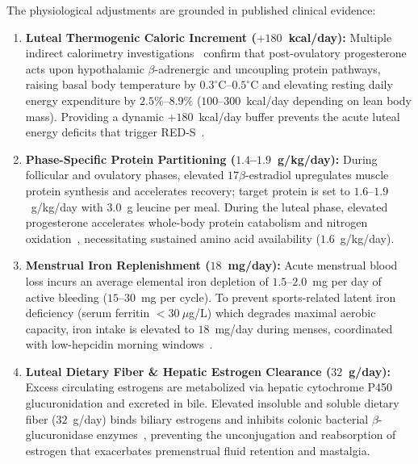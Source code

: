 \documentclass[conference]{IEEEtran}
\begin{document}
The physiological adjustments are grounded in published clinical evidence:
\begin{enumerate}
    \item \textbf{Luteal Thermogenic Caloric Increment ($+180$~kcal/day):} Multiple indirect calorimetry investigations~\cite{barr1995} confirm that post-ovulatory progesterone acts upon hypothalamic $\beta$-adrenergic and uncoupling protein pathways, raising basal body temperature by $0.3^\circ$C--$0.5^\circ$C and elevating resting daily energy expenditure by $2.5\%$--$8.9\%$ ($100$--$300$~kcal/day depending on lean body mass). Providing a dynamic $+180$~kcal/day buffer prevents the acute luteal energy deficits that trigger RED-S~\cite{mountjoy2018}.
    \item \textbf{Phase-Specific Protein Partitioning ($1.4$--$1.9$~g/kg/day):} During follicular and ovulatory phases, elevated $17\beta$-estradiol upregulates muscle protein synthesis and accelerates recovery; target protein is set to $1.6$--$1.9$~g/kg/day with $3.0$~g leucine per meal. During the luteal phase, elevated progesterone accelerates whole-body protein catabolism and nitrogen oxidation~\cite{sims2021, mcnulty2020}, necessitating sustained amino acid availability ($1.6$~g/kg/day).
    \item \textbf{Menstrual Iron Replenishment ($18$~mg/day):} Acute menstrual blood loss incurs an average elemental iron depletion of $1.5$--$2.0$~mg per day of active bleeding ($15$--$30$~mg per cycle). To prevent sports-related latent iron deficiency (serum ferritin $< 30~\mu$g/L) which degrades maximal aerobic capacity, iron intake is elevated to $18$~mg/day during menses, coordinated with low-hepcidin morning windows~\cite{bruinvels2022}.
    \item \textbf{Luteal Dietary Fiber \& Hepatic Estrogen Clearance ($32$~g/day):} Excess circulating estrogens are metabolized via hepatic cytochrome P450 glucuronidation and excreted in bile. Elevated insoluble and soluble dietary fiber ($32$~g/day) binds biliary estrogens and inhibits colonic bacterial $\beta$-glucuronidase enzymes~\cite{baker2017}, preventing the unconjugation and reabsorption of estrogen that exacerbates premenstrual fluid retention and mastalgia.
\end{enumerate}
\end{document}
